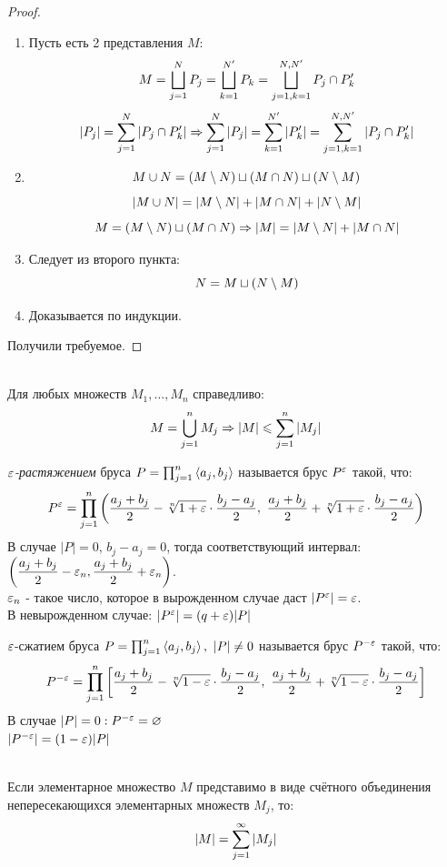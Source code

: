 \begin{proof}
	\begin{enumerate}
		\item Пусть есть 2 представления $M$:
		\[M=\bigsqcup_{j=1}^NP_j=\bigsqcup_{k=1}^{N'}P_k=\bigsqcup_{j=1,k=1}^{N,N'}P_j\cap P_k'\]
		\[|P_j|=\sum_{j=1}^N|P_j\cap P_k'|\Ra\sum_{j=1}^N|P_j|=\sum_{k=1}^{N'}|P_k'|=\sum_{j=1,k=1}^{N,N'}|P_j\cap P_k'|\]
		\item \[M\cup N=(M\setminus N)\sqcup(M\cap N)\sqcup(N\setminus M)\]
		\[|M\cup N|=|M\setminus N|+|M\cap N|+|N\setminus M|\]
		\[M=(M\setminus N)\sqcup(M\cap N)\Rightarrow|M|=|M\setminus N|+|M\cap N|\]
		\item Следует из второго пункта:
		\[N=M\sqcup(N\setminus M)\]
		\item Доказывается по индукции.
	\end{enumerate}
	Получили требуемое.
\end{proof}
\begin{corollary}\\
	Для любых множеств $M_1,\dots,M_n$ справедливо:
	\[M=\bigcup_{j=1}^nM_j\Ra|M|\le\sum_{j=1}^n|M_j|\]
\end{corollary}
\begin{definition}
	$\varepsilon$\textit{-растяжением} бруса $P=\prod_{j=1}^n\left<a_j,b_j\right>$ называется брус $P^\varepsilon$ такой, что: \[P^\varepsilon=\prod_{j=1}^n\left(\frac{a_j+b_j}2-\sqrt[n]{1+\varepsilon}\cdot\frac{b_j-a_j}2,\
	\frac{a_j+b_j}2+\sqrt[n]{1+\varepsilon}\cdot\frac{b_j-a_j}2\right)\]
	В случае $|P|=0$, $b_j-a_j=0$, тогда соответствующий интервал: $\displaystyle\left(\frac{a_j+b_j}2-\varepsilon_n,\frac{a_j+b_j}2+\varepsilon_n\right)$.\\
	$\varepsilon_n$ - такое число, которое в вырожденном случае даст $|P^\varepsilon|=\varepsilon$.\\
	В невырожденном случае: $|P^\varepsilon|=(q+\varepsilon)|P|$
\end{definition}
\begin{definition}
	$\varepsilon$-сжатием бруса $P=\prod_{j=1}^n\l<a_j,b_j\r>,\ |P|\neq0$ называется брус $P^{-\varepsilon}$ такой, что:
	\[P^{-\eps}=\prod_{j=1}^n\l[\frac{a_j+b_j}2-\sqrt[n]{1-\eps}\cdot\frac{b_j-a_j}2,\ \frac{a_j+b_j}2+\sqrt[n]{1-\eps}\cdot\frac{b_j-a_j}2\r]\]
	В случае $|P|=0: P^{-\varepsilon}=\varnothing$\\
	$|P^{-\varepsilon}|=(1-\varepsilon)|P|$
\end{definition}
\begin{theorem}\label{19_th2}\\
	Если элементарное множество $M$ представимо в виде счётного объединения непересекающихся элементарных множеств $M_j$, то:
	\[|M|=\sum_{j=1}^\i|M_j|\]
\end{theorem}
